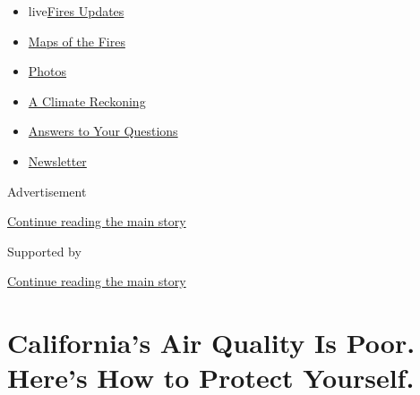 \begin{itemize}
\tightlist
\item
  live\href{https://www.nytimes3xbfgragh.onion/2020/09/12/us/wildfires-live-updates.html?name=styln-california-wildfires\&region=TOP_BANNER\&block=storyline_menu_recirc\&action=click\&pgtype=Article\&impression_id=55b37861-f52d-11ea-8682-bfbfb46aa2bd\&variant=undefined}{Fires
  Updates}
\item
  \href{https://www.nytimes3xbfgragh.onion/interactive/2020/us/fires-map-tracker.html?name=styln-california-wildfires\&region=TOP_BANNER\&block=storyline_menu_recirc\&action=click\&pgtype=Article\&impression_id=55b37862-f52d-11ea-8682-bfbfb46aa2bd\&variant=undefined}{Maps
  of the Fires}
\item
  \href{https://www.nytimes3xbfgragh.onion/article/wildfires-photos-california-oregon-washington-state.html?name=styln-california-wildfires\&region=TOP_BANNER\&block=storyline_menu_recirc\&action=click\&pgtype=Article\&impression_id=55b37863-f52d-11ea-8682-bfbfb46aa2bd\&variant=undefined}{Photos}
\item
  \href{https://www.nytimes3xbfgragh.onion/2020/09/10/us/climate-change-california-wildfires.html?name=styln-california-wildfires\&region=TOP_BANNER\&block=storyline_menu_recirc\&action=click\&pgtype=Article\&impression_id=55b37864-f52d-11ea-8682-bfbfb46aa2bd\&variant=undefined}{A
  Climate Reckoning}
\item
  \href{https://www.nytimes3xbfgragh.onion/article/wildfires-california-oregon-washington.html?name=styln-california-wildfires\&region=TOP_BANNER\&block=storyline_menu_recirc\&action=click\&pgtype=Article\&impression_id=55b37865-f52d-11ea-8682-bfbfb46aa2bd\&variant=undefined}{Answers
  to Your Questions}
\item
  \href{https://www.nytimes3xbfgragh.onion/2020/09/09/us/california-wildfires.html?name=styln-california-wildfires\&region=TOP_BANNER\&block=storyline_menu_recirc\&action=click\&pgtype=Article\&impression_id=55b37866-f52d-11ea-8682-bfbfb46aa2bd\&variant=undefined}{Newsletter}
\end{itemize}

Advertisement

\protect\hyperlink{after-top}{Continue reading the main story}

Supported by

\protect\hyperlink{after-sponsor}{Continue reading the main story}

\hypertarget{californias-air-quality-is-poor-heres-how-to-protect-yourself}{%
\section{California's Air Quality Is Poor. Here's How to Protect
Yourself.}\label{californias-air-quality-is-poor-heres-how-to-protect-yourself}}

